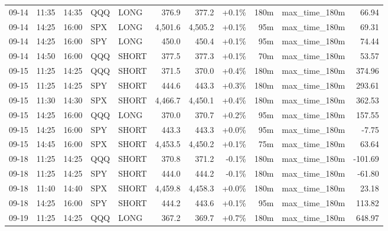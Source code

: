 \documentclass[11pt,a4paper,twoside]{article}
\begin{document}
\begin{center}
\begin{longtable}{>{\color{txtmain}}l l l l l r r r r >{\color{txtmain}}l r}
09-14 & 11:35 & 14:35 & QQQ & LONG & 376.9 & 377.2 & \textcolor{wingreen}{+0.1\%} & 180m & max\_time\_180m & \textcolor{wingreen}{66.94} \\
09-14 & 14:25 & 16:00 & SPX & LONG & 4,501.6 & 4,505.2 & \textcolor{wingreen}{+0.1\%} & 95m & max\_time\_180m & \textcolor{wingreen}{69.31} \\
09-14 & 14:25 & 16:00 & SPY & LONG & 450.0 & 450.4 & \textcolor{wingreen}{+0.1\%} & 95m & max\_time\_180m & \textcolor{wingreen}{74.44} \\
09-14 & 14:50 & 16:00 & QQQ & SHORT & 377.5 & 377.3 & \textcolor{wingreen}{+0.1\%} & 70m & max\_time\_180m & \textcolor{wingreen}{53.57} \\
09-15 & 11:25 & 14:25 & QQQ & SHORT & 371.5 & 370.0 & \textcolor{wingreen}{+0.4\%} & 180m & max\_time\_180m & \textcolor{wingreen}{374.96} \\
09-15 & 11:25 & 14:25 & SPY & SHORT & 444.6 & 443.3 & \textcolor{wingreen}{+0.3\%} & 180m & max\_time\_180m & \textcolor{wingreen}{293.61} \\
09-15 & 11:30 & 14:30 & SPX & SHORT & 4,466.7 & 4,450.1 & \textcolor{wingreen}{+0.4\%} & 180m & max\_time\_180m & \textcolor{wingreen}{362.53} \\
09-15 & 14:25 & 16:00 & QQQ & LONG & 370.0 & 370.7 & \textcolor{wingreen}{+0.2\%} & 95m & max\_time\_180m & \textcolor{wingreen}{157.55} \\
09-15 & 14:25 & 16:00 & SPY & SHORT & 443.3 & 443.3 & \textcolor{wingreen}{+0.0\%} & 95m & max\_time\_180m & \textcolor{lossred}{-7.75} \\
09-15 & 14:45 & 16:00 & SPX & SHORT & 4,453.5 & 4,450.2 & \textcolor{wingreen}{+0.1\%} & 75m & max\_time\_180m & \textcolor{wingreen}{63.64} \\
09-18 & 11:25 & 14:25 & QQQ & SHORT & 370.8 & 371.2 & \textcolor{lossred}{-0.1\%} & 180m & max\_time\_180m & \textcolor{lossred}{-101.69} \\
09-18 & 11:25 & 14:25 & SPY & SHORT & 444.0 & 444.2 & \textcolor{lossred}{-0.1\%} & 180m & max\_time\_180m & \textcolor{lossred}{-61.80} \\
09-18 & 11:40 & 14:40 & SPX & SHORT & 4,459.8 & 4,458.3 & \textcolor{wingreen}{+0.0\%} & 180m & max\_time\_180m & \textcolor{wingreen}{23.18} \\
09-18 & 14:25 & 16:00 & SPY & SHORT & 444.2 & 443.6 & \textcolor{wingreen}{+0.1\%} & 95m & max\_time\_180m & \textcolor{wingreen}{113.82} \\
09-19 & 11:25 & 14:25 & QQQ & LONG & 367.2 & 369.7 & \textcolor{wingreen}{+0.7\%} & 180m & max\_time\_180m & \textcolor{wingreen}{648.97} \\

\end{longtable}
\end{center}
\end{document}

